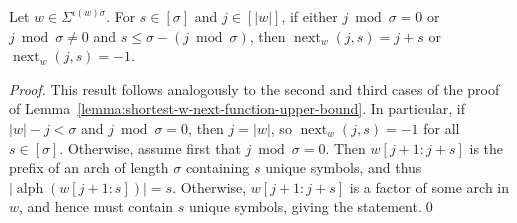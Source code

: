 \documentclass[runningheads,UKenglish,cleveref, autoref, thm-restate]{llncs}
\DeclareMathOperator{\alphabet}{alph}
\DeclareMathOperator{\nextAlphPos}{next}
\newif\ifpaper
\begin{document}
\fi



\begin{lemma}\label{lemma:shortest-w-next-function-upper-bound-same-arch}
    Let $w\in\Sigma^{\iota(w) \sigma}$.
    For $s\in[\sigma]$ and $j\in[|w|]$, if either $j \bmod \sigma = 0$ or $j \bmod \sigma \neq 0$ and $s \leq \sigma-(j\bmod\sigma)$, then
    $ \nextAlphPos_w(j,s) = j+s$ or $ \nextAlphPos_w(j,s) = -1$.
\end{lemma}
\ifpaper
\else
\begin{proof}
	This result follows analogously to the second and third cases of the proof of Lemma~\ref{lemma:shortest-w-next-function-upper-bound}. In particular, if $|w| - j < \sigma$ and $j \bmod \sigma = 0$, then $j = |w|$, so $\nextAlphPos_w(j,s) = -1$ for all $s\in[\sigma]$. 
	Otherwise, assume first that $j \bmod \sigma = 0$. Then $w[j + 1: j + s]$ is the prefix of an arch of length $\sigma$ containing $s$ unique symbols, and thus $\vert \alphabet(w[j + 1 : s]) \vert = s$. Otherwise, $w[j + 1: j + s]$ is a factor of some arch in $w$, and hence must contain $s$ unique symbols, giving the statement.\qed%
\end{proof}
\fi
\end{document}
